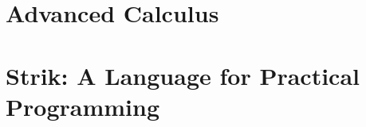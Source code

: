 \documentclass[
  luatex,
  japanese,
  unicode,
  titlepage,
  pdfusetitle
]{ltjsbook}
\begin{document}
\chapter{Advanced Calculus}

\chapter{Strik: A Language for Practical Programming}







\end{document}
